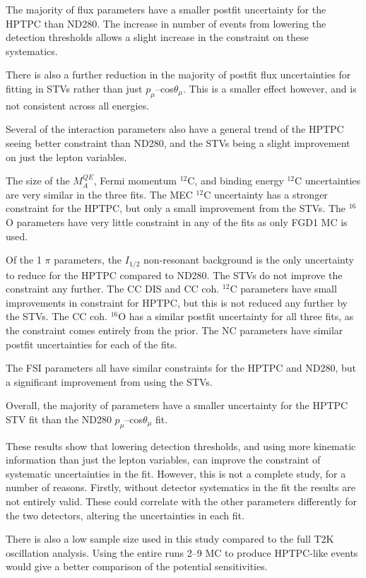 The majority of flux parameters have a smaller postfit uncertainty for the HPTPC than ND280. The increase in number of events from lowering the detection thresholds allows a slight increase in the constraint on these systematics.

There is also a further reduction in the majority of postfit flux uncertainties for fitting in STVs rather than just $p_{\mu}$--cos$\theta_{\mu}$. This is a smaller effect however, and is not consistent across all energies.

Several of the interaction parameters also have a general trend of the HPTPC seeing better constraint than ND280, and the STVs being a slight improvement on just the lepton variables.

The size of the $M_{A}^{QE}$, Fermi momentum $^{12}$C, and binding energy $^{12}$C uncertainties are very similar in the three fits. The MEC $^{12}$C uncertainty has a stronger constraint for the HPTPC, but only a small improvement from the STVs. The $^{16}$O parameters have very little constraint in any of the fits as only FGD1 MC is used. 

Of the 1 $\pi$ parameters, the $I_{1/2}$ non-resonant background is the only uncertainty to reduce for the HPTPC compared to ND280. The STVs do not improve the constraint any further. The CC DIS and CC coh. $^{12}$C parameters have small improvements in constraint for HPTPC, but this is not reduced any further by the STVs. The CC coh. $^{16}$O has a similar postfit uncertainty for all three fits, as the constraint comes entirely from the prior. The NC parameters have similar postfit uncertainties for each of the fits.

The FSI parameters all have similar constraints for the HPTPC and ND280, but a significant improvement from using the STVs.

Overall, the majority of parameters have a smaller uncertainty for the HPTPC STV fit than the ND280 $p_{\mu}$--cos$\theta_{\mu}$ fit.

These results show that lowering detection thresholds, and using more kinematic information than just the lepton variables, can improve the constraint of systematic uncertainties in the fit. However, this is not a complete study, for a number of reasons. Firstly, without detector systematics in the fit the results are not entirely valid. These could correlate with the other parameters differently for the two detectors, altering the uncertainties in each fit.

There is also a low sample size used in this study compared to the full T2K oscillation analysis. Using the entire runs 2--9 MC to produce HPTPC-like events would give a better comparison of the potential sensitivities.

